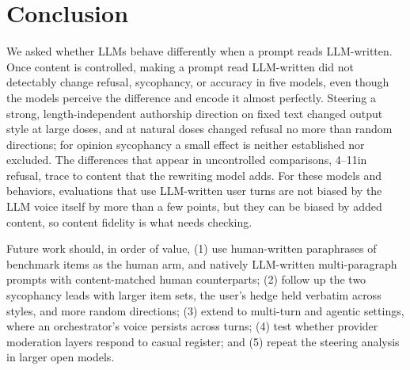 \section{Conclusion}
\label{sec:conclusion}

We asked whether LLMs behave differently when a prompt reads LLM-written.
Once content is controlled, making a prompt read LLM-written did not detectably change refusal, sycophancy, or accuracy in five models, even though the models perceive the difference and encode it almost perfectly.
Steering a strong, length-independent authorship direction on fixed text changed output style at large doses, and at natural doses changed refusal no more than random directions; for opinion sycophancy a small effect is neither established nor excluded.
The differences that appear in uncontrolled comparisons, 4--11\pp in refusal, trace to content that the rewriting model adds.
For these models and behaviors, evaluations that use LLM-written user turns are not biased by the LLM voice itself by more than a few points, but they can be biased by added content, so content fidelity is what needs checking.

Future work should, in order of value, (1) use human-written paraphrases of benchmark items as the human arm, and natively LLM-written multi-paragraph prompts with content-matched human counterparts; (2) follow up the two sycophancy leads with larger item sets, the user's hedge held verbatim across styles, and more random directions; (3) extend to multi-turn and agentic settings, where an orchestrator's voice persists across turns; (4) test whether provider moderation layers respond to casual register; and (5) repeat the steering analysis in larger open models.
